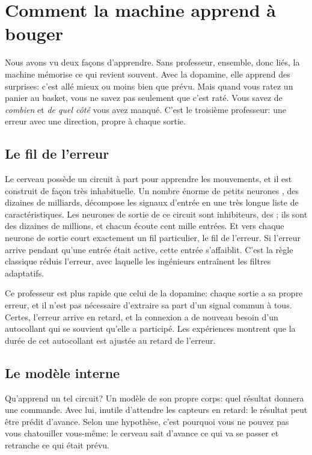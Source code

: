 \chapter{Comment la machine apprend à bouger}

Nous avons vu deux façons d'apprendre. Sans professeur, \og ensemble, donc liés\fg{}, la machine mémorise ce qui revient souvent. Avec la dopamine, elle apprend des surprises: c'est allé mieux ou moins bien que prévu. Mais quand vous ratez un panier au basket, vous ne savez pas seulement que c'est raté. Vous savez de \emph{combien} et \emph{de quel côté} vous avez manqué. C'est le troisième professeur: une erreur avec une direction, propre à chaque sortie.

\section*{Le fil de l'erreur}

Le cerveau possède un circuit à part pour apprendre les mouvements, et il est construit de façon très inhabituelle. Un nombre énorme de petits neurones , des dizaines de milliards, décompose les signaux d'entrée en une très longue liste de caractéristiques. Les neurones de sortie de ce circuit sont inhibiteurs, des ; ils sont des dizaines de millions, et chacun écoute cent mille entrées. Et vers chaque neurone de sortie court exactement un fil particulier, le fil de l'erreur. Si l'erreur arrive pendant qu'une entrée était active, cette entrée s'affaiblit. C'est la règle classique \og réduis l'erreur\fg{}, avec laquelle les ingénieurs entraînent les filtres adaptatifs.


Ce professeur est plus rapide que celui de la dopamine: chaque sortie a sa propre erreur, et il n'est pas nécessaire d'extraire sa part d'un signal commun à tous. Certes, l'erreur arrive en retard, et la connexion a de nouveau besoin d'un \og autocollant\fg{} qui se souvient qu'elle a participé. Les expériences montrent que la durée de cet autocollant est ajustée au retard de l'erreur.

\section*{Le modèle interne}

Qu'apprend un tel circuit? Un modèle de son propre corps: quel résultat donnera une commande. Avec lui, inutile d'attendre les capteurs en retard: le résultat peut être prédit d'avance. Selon une hypothèse, c'est pourquoi vous ne pouvez pas vous chatouiller vous-même: le cerveau sait d'avance ce qui va se passer et retranche ce qui était prévu.

